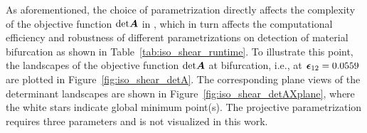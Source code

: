 \documentclass[12pt]{article}
\numberwithin{equation}{section}
\begin{document}
As aforementioned, the choice of parametrization directly affects the 
complexity of the objective function ${\rm det}{\boldsymbol{A}}$ in 
, which in turn affects the 
computational efficiency and robustness of different parametrizations 
on detection of material bifurcation as shown in 
Table~\ref{tab:iso_shear_runtime}. To illustrate this point, the 
landscapes of the objective function ${\rm det}{\boldsymbol{A}}$ at bifurcation, 
i.e., at ${\boldsymbol{\epsilon}}_{12}=0.0559$ are plotted in 
Figure~\ref{fig:iso_shear_detA}. The corresponding plane views of the 
determinant landscapes are shown in 
Figure~\ref{fig:iso_shear_detAXplane}, where the white stars indicate 
global minimum point(s). The projective parametrization requires three parameters and is not visualized in this work.

\begin{figure}[H]
   \centering {}  
\end{figure}
\end{document}
